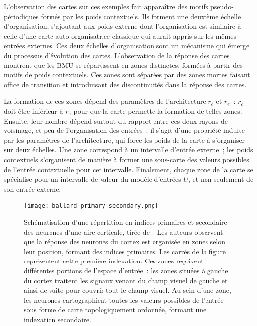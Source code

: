 \documentclass[../main]{subfiles}
\begin{document}
L'observation des cartes sur ces exemples fait apparaître des motifs pseudo-périodiques formés par les poids contextuels. Ils forment une deuxième échelle d'organisation, s'ajoutant aux poids externe dont l'organisation est similaire à celle d'une carte auto-organisatrice classique qui aurait appris sur les mêmes entrées externes.
Ces deux échelles d'organisation sont un mécanisme qui émerge du processus d'évolution des cartes.
L'observation de la réponse des cartes montrent que les BMU se répartissent en zones distinctes, formées à partir des motifs de poids contextuels. Ces zones sont séparées par des zones mortes faisant office de transition et introduisant des discontinuités dans la réponse des cartes.

La formation de ces zones dépend des paramètres de l'architecture $r_c$ et $r_e$~: $r_c$ doit être inférieur à $r_e$ pour que la carte permette la formation de telles zones. 
Ensuite, leur nombre dépend surtout du rapport entre ces deux rayons de voisinage, et peu de l'organisation des entrées~: il s'agit d'une propriété induite par les paramètres de l'architecture, qui force les poids de la carte à s'organiser sur deux échelles.
Une zone correspond à un intervalle d'entrée externe~; les poids contextuels s'organisent de manière à former une sous-carte des valeurs possibles de l'entrée contextuelle pour cet intervalle.
Finalement, chaque zone de la carte se spécialise pour un intervalle de valeur du modèle d'entrées $U$, et non seulement de son entrée externe.

\begin{figure}
	\centering\texttt{[image: ballard\_primary\_secondary.png]}
	\vspace{-0.5cm}
	\caption{Schématisation d'une répartition en indices primaires et secondaire des neurones d'une aire corticale, tirée de~\cite{ballard_cortical_1986}. 
	Les auteurs observent que la réponse des neurones du cortex est organisée en zones selon leur position, formant des indices primaires. Les carrés de la figure représentent cette première indexation.
	Ces zones reçoivent différentes portions de l'espace d'entrée~: les zones situées à gauche du cortex traitent les signaux venant du champ visuel de gauche et ainsi de suite pour couvrir tout le champ visuel.
	Au sein d'une zone, les neurones cartographient toutes les valeurs possibles de l'entrée sous forme de carte topologiquement ordonnée, formant une indexation secondaire. \label{fig:ballard}}
\end{figure}
\end{document}
